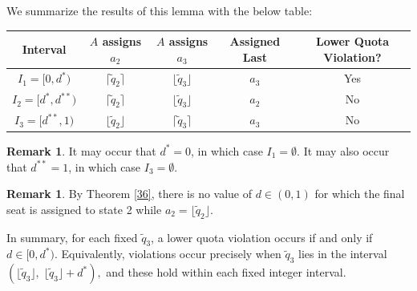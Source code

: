 \documentclass[11pt]{article}
\theoremstyle{definition}
\newtheorem{remark}[theorem]{Remark}
\theoremstyle{definition}
\begin{document}
We summarize the results of this lemma with the below table: 

\begin{center}
\begin{tabular}{ |c|c|c|c|c| } 
\hline
Interval & $A$ assigns $a_2$ & $A$ assigns $a_3$ & Assigned Last & Lower Quota Violation?\\
\hline
$I_1 = [0, d^*)$ & $\lceil \tilde{q}_2 \rceil$ & $\lfloor \tilde{q}_3 \rfloor$ &$a_3$ & Yes \\
$I_2 = [d^*,d^{**})$ & $\lceil \tilde{q}_2 \rceil$ & $\lfloor \tilde{q}_3 \rfloor$ &$a_2$ & No \\
$I_3 = [d^{**},1)$ & $\lfloor \tilde{q}_2 \rfloor$ & $\lceil \tilde{q}_3 \rceil$ &$a_3$ & No\\
\hline
\end{tabular}
\end{center}


\begin{remark} 
It may occur that $d^*=0$, in which case $I_1=\emptyset$. It may also occur that $d^{**}=1$, in which case $I_3=\emptyset$.
\end{remark}

\begin{remark}\label{d.noCase4}
By Theorem \ref{36}, there is no value of $d \in (0,1)$ for which the final seat is assigned to state 2 while $a_2=\lfloor \tilde q_2 \rfloor$.
\end{remark}

In summary, for each fixed $\tilde q_3$, a lower quota violation occurs if and only if $d \in [0,d^*).$
Equivalently, violations occur precisely when $\tilde q_3$ lies in the interval $(\lfloor \tilde q_3 \rfloor,\; \lfloor \tilde q_3 \rfloor + d^*),$ and these hold within each fixed integer interval. 
\end{document}
